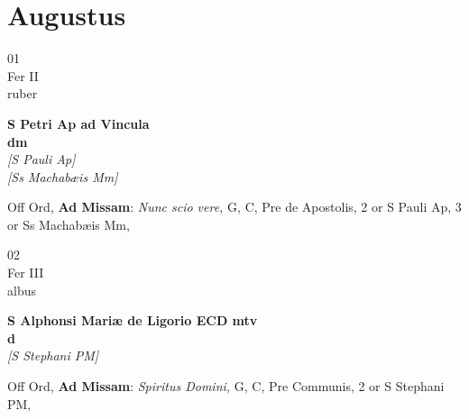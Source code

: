 \documentclass[10pt, openany]{book}
\begin{document}
        \chapter{Augustus}
                        
        \begin{center}
            \begin{minipage}{3.5in}
                \vspace{2em}
                \begin{minipage}{0.5in}
                    {\Huge 01} \\
                    {\normalsize Fer II} \\
                    {\normalsize ruber}
                \end{minipage}
                \begin{minipage}{3.0in}
                    \textbf{ \large S Petri Ap ad Vincula \\
                    \textnormal{\normalsize dm}} \\ \textit{[S Pauli Ap]} \\ \textit{[Ss Machabæis Mm]} \\ 
                \end{minipage}
                \begin{justify}Off Ord, \textbf{Ad Missam}: \textit{Nunc scio vere,} G, C, Pre de Apostolis, 2 or S Pauli Ap, 3 or Ss Machabæis Mm,  
                \end{justify}
            \end{minipage}
        \end{center}
    
        \begin{center}
            \begin{minipage}{3.5in}
                \vspace{2em}
                \begin{minipage}{0.5in}
                    {\Huge 02} \\
                    {\normalsize Fer III} \\
                    {\normalsize albus}
                \end{minipage}
                \begin{minipage}{3.0in}
                    \textbf{ \large S Alphonsi Mariæ de Ligorio ECD mtv \\
                    \textnormal{\normalsize d}} \\ \textit{[S Stephani PM]} \\ 
                \end{minipage}
                \begin{justify}Off Ord, \textbf{Ad Missam}: \textit{Spiritus Domini,} G, C, Pre Communis, 2 or S Stephani PM,  
                \end{justify}
            \end{minipage}
        \end{center}
    
\end{document}
